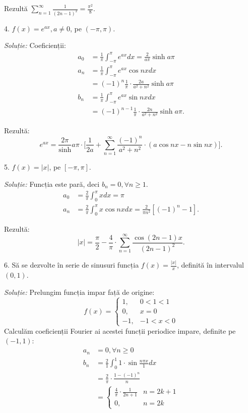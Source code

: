 \documentclass[11pt,a4paper]{article}
\theoremstyle{dotless}
\theoremstyle{dotlessdr}
\begin{document}
Rezultă $\sum_{n = 1}^\infty \frac{1}{(2n - 1)^2} = \frac{\pi^2}{8}$.

\vspace{1cm}

4. $f(x) = e^{ax}, a \neq 0$, pe $(-\pi, \pi)$.

\emph{Soluție:} Coeficienții:
\begin{align*}
  a_0 &= \frac{1}{\pi} \int_{-\pi}^\pi e^{ax} dx = \frac{2}{a\pi} \sinh a\pi \\
  a_n &= \frac{1}{\pi} \int_{-\pi}^\pi e^{ax} \cos nx dx \\
      &= (-1)^n \frac{1}{\pi} \cdot \frac{2a}{a^2 + n^2} \sinh a\pi \\
  b_n &= \frac{1}{\pi} \int_{-\pi}^\pi e^{ax} \sin nx dx \\
      &= (-1)^{n - 1} \frac{1}{\pi} \cdot \frac{2n}{a^2 + n^2} \sinh a\pi.
\end{align*}

Rezultă:
\[
  e^{ax} = \frac{2\pi} \sinh a\pi \cdot
  \Bigg[ \frac{1}{2a} + \sum_{n = 1}^\infty \frac{(-1)^n}{a^2 + n^2} \cdot
  (a \cos nx - n \sin nx) \Bigg].
\]

\vspace{1cm}

5. $f(x) = |x|$, pe $[-\pi, \pi]$.

\emph{Soluție:} Funcția este pară, deci $b_n = 0, \forall n \geq 1$.
\begin{align*}
  a_0 &= \frac{2}{\pi} \int_0^\pi x dx = \pi \\
  a_n &= \frac{2}{\pi} \int_0^\pi x \cos nx dx =
        \frac{2}{\pi n^2} [(-1)^n - 1].
\end{align*}

Rezultă:
\[
  |x| = \frac{\pi}{2} - \frac{4}{\pi} \cdot
  \sum_{n = 1}^\infty \frac{\cos(2n - 1) x}{(2n - 1)^2}.
\]

\vspace{1cm}

6. Să se dezvolte în serie de sinusuri funcția $f(x) = \frac{|x|}{x}$, definită
în intervalul $(0, 1)$.

\emph{Soluție:} Prelungim funcția impar față de origine:
\[
  f(x) =
  \begin{cases}
    1,  & 0 < 1 < 1\\
    0,  & x = 0 \\
    -1, & -1 < x < 0
  \end{cases}
\]
Calculăm coeficienții Fourier ai acestei funcții periodice impare, definite
pe $(-1, 1)$:
\begin{align*}
  a_n &= 0, \forall n \geq 0 \\
  b_n &= \frac{2}{1} \int_0^1 1 \cdot \sin \frac{n \pi x}{1} dx \\
      &= \frac{2}{\pi} \cdot \frac{1 - (-1)^n}{n} \\
      &= \begin{cases}
        \frac{4}{\pi} \cdot \frac{1}{2n +1}  & n = 2k + 1 \\
        0, & n = 2k
      \end{cases}
\end{align*}
\end{document}
